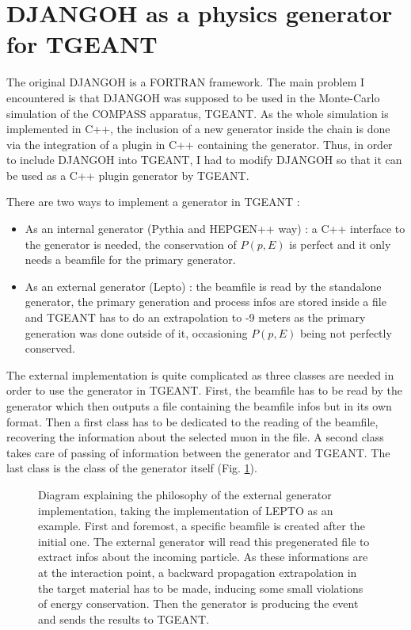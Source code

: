 
\section{DJANGOH as a physics generator for TGEANT}

The original DJANGOH is a FORTRAN framework. The main problem I encountered is that DJANGOH was supposed to be used in the Monte-Carlo simulation of the COMPASS apparatus, TGEANT. As the whole simulation is implemented in C++, the inclusion of a new generator inside the chain is done via the integration of a plugin in C++ containing the generator. Thus, in order to include DJANGOH into TGEANT, I had to modify DJANGOH so that it can be used as a C++ plugin generator by TGEANT.

There are two ways to implement a generator in TGEANT :
\begin{itemize}
\item As an internal generator (Pythia and HEPGEN++ way) : a C++ interface to the
generator is needed, the conservation of $P(p,E)$ is perfect and it only needs a
beamfile for the primary generator.
\item As an external generator (Lepto) : the beamfile is read by the standalone
generator, the primary generation and process infos are stored inside a file and
TGEANT has to do an extrapolation to -9 meters as the primary generation was done
outside of it, occasioning $P(p,E)$ being not perfectly conserved.
\end{itemize}

The external implementation is quite complicated as three classes are needed in order
to use the generator in TGEANT. First, the beamfile has to be read by the generator
which then outputs a file containing the beamfile infos but in its own format.
Then a first class has to be dedicated to the reading of the beamfile, recovering
the information about the selected muon in the file. A second class takes care of
passing of information between the generator and TGEANT. The last class is the
class of the generator itself (Fig. \ref{fig:leptoex}).

\begin{figure}[!htb]
\centerline{}
\caption{Diagram explaining the philosophy of the external generator implementation, taking the
implementation of LEPTO as an example. First and foremost, a specific beamfile is created after the
initial one. The external generator will read this pregenerated file to extract infos about the incoming
particle. As these informations are at the interaction point, a backward propagation extrapolation in the
target material has to be made, inducing some small violations of energy conservation.
Then the generator is producing the event and sends the results to TGEANT.}\label{fig:leptoex}
\end{figure}

